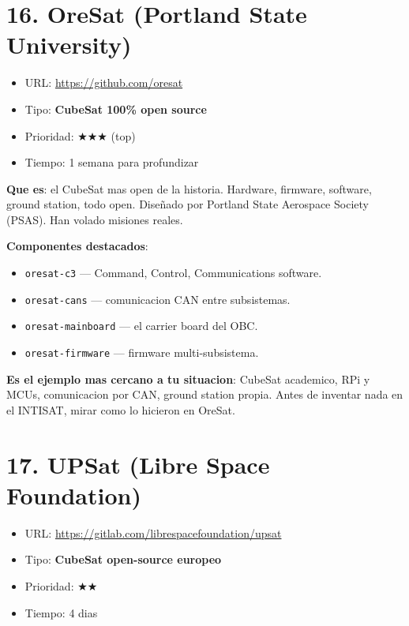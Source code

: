 \documentclass[11pt,a4paper,oneside]{report}
\begin{document}
\section{16. OreSat (Portland State University)}

\begin{itemize}[leftmargin=1.5em]
  \item URL: \url{https://github.com/oresat}
  \item Tipo: \textbf{CubeSat 100\% open source}
  \item Prioridad: $\bigstar\bigstar\bigstar$ (top)
  \item Tiempo: 1 semana para profundizar
\end{itemize}

\textbf{Que es}: el CubeSat mas open de la historia. Hardware, firmware,
software, ground station, todo open. Diseñado por Portland State Aerospace
Society (PSAS). Han volado misiones reales.

\textbf{Componentes destacados}:
\begin{itemize}[leftmargin=2em]
  \item \texttt{oresat-c3} --- Command, Control, Communications software.
  \item \texttt{oresat-cans} --- comunicacion CAN entre subsistemas.
  \item \texttt{oresat-mainboard} --- el carrier board del OBC.
  \item \texttt{oresat-firmware} --- firmware multi-subsistema.
\end{itemize}

\begin{nota}
\textbf{Es el ejemplo mas cercano a tu situacion}: CubeSat academico, RPi
y MCUs, comunicacion por CAN, ground station propia. Antes de inventar
nada en el INTISAT, mirar como lo hicieron en OreSat.
\end{nota}

\section{17. UPSat (Libre Space Foundation)}

\begin{itemize}[leftmargin=1.5em]
  \item URL: \url{https://gitlab.com/librespacefoundation/upsat}
  \item Tipo: \textbf{CubeSat open-source europeo}
  \item Prioridad: $\bigstar\bigstar$
  \item Tiempo: 4 dias
\end{itemize}
\end{document}
